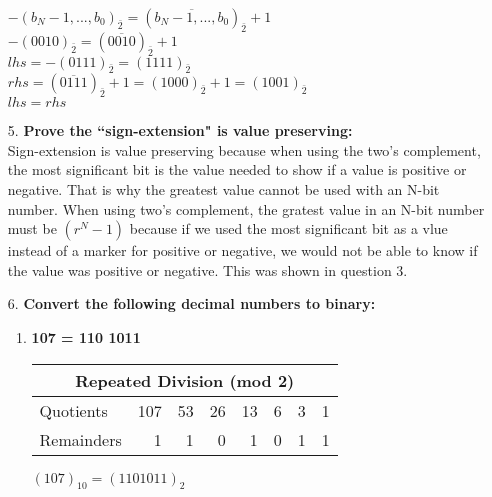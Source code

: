 \documentclass{article}
\begin{document}
\begin{enumerate}
			$-(b_N-1,...,b_0)_{\bar{2}} = (\overline{b_N-1,...,b_0})_{\bar{2}}+1$ \\

			$-(0010)_{\bar{2}} = (\overline{0010})_{\bar{2}}+1$ \\

			$lhs = -(0111)_{\bar{2}} = (1111)_{\bar{2}}$ \\

			$rhs = (\overline{0111})_{\bar{2}}+1 = (1000)_{\bar{2}}+1 = (1001)_{\bar{2}}$ \\

			$lhs = rhs$ \\
		
		\item[5.] %
			\textbf{Prove the ``sign-extension" is value preserving:} \\ 

			Sign-extension is value preserving because when using the two's complement, the most significant bit is the value needed to show if a value is positive or negative. That is why the greatest value cannot be used with an N-bit number. When using two's complement, the gratest value in an N-bit number must be $(r^N - 1)$ because if we used the most significant bit as a vlue instead of a marker for positive or negative, we would not be able to know if the value was positive or negative. This was shown in question 3.
		
		\item[6.] %
		\textbf{Convert the following decimal numbers to binary: } \\
			
			\begin{enumerate}
				\item \textbf{107 = 110 1011} \\

					\begin{center}
					\begin{tabular}{lrrrrrrr}
						\hline
						\multicolumn{8}{c}{Repeated Division (mod 2)}\\\hline
						Quotients  & 107 & 53 & 26 & 13 & 6 & 3 & 1\\
						Remainders &   1 &  1 &  0 &  1 & 0 & 1 & 1\\\hline		
					\end{tabular}

					$(107)_{10} = (1101011)_2$
					\end{center}
				

\end{enumerate}
\end{enumerate}
\end{document}
